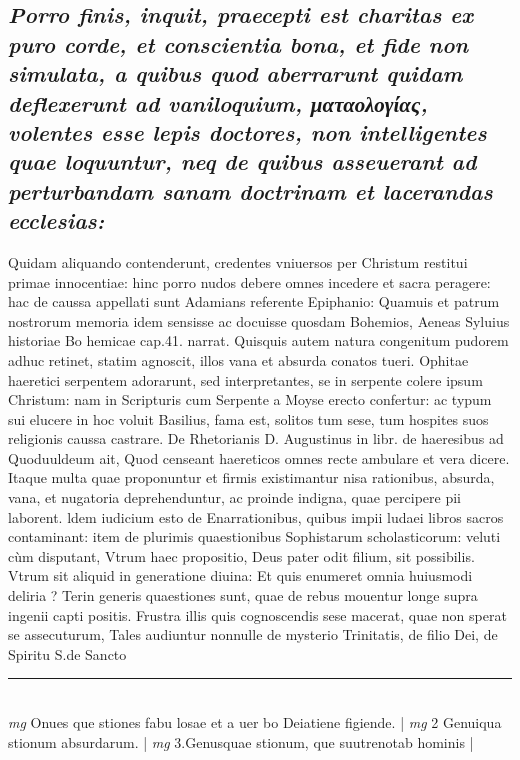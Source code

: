\documentclass{article}
\begin{document}
\begin{pages}
\subsection*{\textit{Porro finis, inquit, praecepti est charitas ex puro corde, et conscientia bona, et fide non simulata, a quibus quod aberrarunt quidam deflexerunt ad vaniloquium, ματαολογίας, volentes esse lepis doctores, non intelligentes quae loquuntur, neq de quibus asseuerant ad perturbandam sanam doctrinam et lacerandas ecclesias: }}\pstart Quidam aliquando contenderunt, credentes vniuersos per Christum restitui primae innocentiae: hinc porro nudos debere omnes incedere et sacra peragere: hac de caussa appellati sunt Adamians referente Epiphanio: Quamuis et patrum nostrorum memoria idem sensisse ac docuisse quosdam Bohemios, Aeneas Syluius historiae Bo hemicae cap.41. narrat. Quisquis autem natura congenitum pudorem adhuc retinet, statim agnoscit, illos vana et absurda conatos tueri. Ophitae haeretici serpentem adorarunt, sed interpretantes, se in serpente colere ipsum Christum: nam in Scripturis cum Serpente a Moyse erecto confertur: ac typum sui elucere in hoc voluit Basilius, fama est, solitos tum sese, tum hospites suos religionis caussa castrare. De Rhetorianis D. Augustinus in libr. de haeresibus ad Quoduuldeum ait, Quod censeant haereticos omnes recte ambulare et vera dicere. Itaque  multa quae proponuntur et firmis existimantur nisa rationibus, absurda, vana, et nugatoria deprehenduntur, ac proinde indigna, quae percipere pii laborent. ldem iudicium esto de Enarrationibus, quibus impii ludaei libros sacros contaminant: item de plurimis quaestionibus Sophistarum scholasticorum: veluti cùm disputant, Vtrum haec propositio, Deus pater odit filium, sit possibilis. Vtrum sit aliquid in generatione diuina: Et quis enumeret omnia huiusmodi deliria ?  \pend\pstart Terin generis quaestiones sunt, quae de rebus mouentur longe supra ingenii capti positis. Frustra illis quis cognoscendis sese macerat, quae non sperat se assecuturum, Tales audiuntur nonnulle de mysterio Trinitatis, de filio Dei, de Spiritu S.de Sancto  \pend
\vspace{0.5cm}\noindent
\vspace{0.2cm}\rule{1cm}{0.2pt}\\ 
\hspace{0.2cm}\textit{mg}
\footnotesize Onues que stiones fabu losae et a uer bo Deiatiene figiende. 
\normalsize| 
\hspace{0.2cm}\textit{mg}
\footnotesize 2 Genuiqua stionum absurdarum. 
\normalsize| 
\hspace{0.2cm}\textit{mg}
\footnotesize 3.Genusquae stionum, que suutrenotab hominis 
\normalsize| 

\end{pages}
\end{document}
